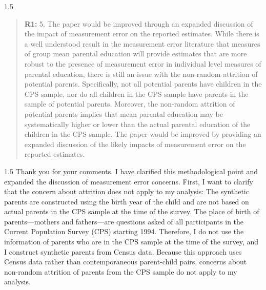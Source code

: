 \documentclass[12pt,english]{article}
\newcommand{\rrxspc}{1.5}
\begin{document}
\begin{refsection}
\begin{spacing}{\rrxspc}
\begin{quotation}
    \textbf{R1: } 5. The paper would be improved through an expanded discussion of the impact of measurement error on the reported estimates. While there is a well understood result in the measurement error literature that measures of group mean parental education will provide estimates that are more robust to the presence of measurement error in individual level measures of parental education, there is still an issue with the non-random attrition of potential parents. Specifically, not all potential parents have children in the CPS sample, nor do all children in the CPS sample have parents in the sample of potential parents. Moreover, the non-random attrition of potential parents implies that mean parental education may be systematically higher or lower than the actual parental education of the children in the CPS sample. The paper would be improved by providing an expanded discussion of the likely impacts of measurement error on the reported estimates.
    \end{quotation}
\end{spacing}
\begin{spacing}{\rrxspc}
    Thank you for your comments. I have clarified this methodological point and expanded the discussion of measurement error concerns. First, I want to clarify that the concern about attrition does not apply to my analysis: The synthetic parents are constructed using the birth year of the child and are not based on actual parents in the CPS sample at the time of the survey. The place of birth of parents---mothers and fathers---are questions asked of all participants in the Current Population Survey (CPS) starting 1994. Therefore, I do not use the information of parents who are in the CPS sample at the time of the survey, and I construct synthetic parents from Census data. Because this approach uses Census data rather than contemporaneous parent-child pairs, concerns about non-random attrition of parents from the CPS sample do not apply to my analysis. 
    \end{spacing} 


\end{refsection}
\end{document}
